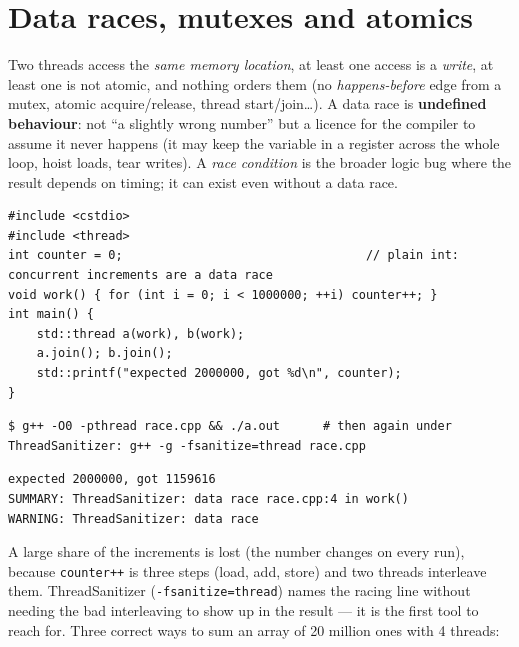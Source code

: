 \documentclass[10pt,a4paper,openany,oneside]{report}
\newcommand{\prio}[1]{\texorpdfstring{\ifcase#1\or{\color{gold}\ding{72}}\or{\color{gold}\ding{72}\ding{72}}\or{\color{gold}\ding{72}\ding{72}\ding{72}}\fi}{}}
\begin{document}
\section{Data races, mutexes and atomics \prio{3}}
\begin{defbox}
Two threads access the \emph{same memory location}, at least one access is a \emph{write}, at least one is not atomic, and nothing orders them (no \emph{happens-before} edge from a mutex, atomic acquire/release, thread start/join\ldots). A data race is \textbf{undefined behaviour}: not ``a slightly wrong number'' but a licence for the compiler to assume it never happens (it may keep the variable in a register across the whole loop, hoist loads, tear writes). A \emph{race condition} is the broader logic bug where the result depends on timing; it can exist even without a data race.
\end{defbox}
\begin{lstlisting}[language={[11]C++},title={race.cpp}]
#include <cstdio>
#include <thread>
int counter = 0;                                  // plain int: concurrent increments are a data race
void work() { for (int i = 0; i < 1000000; ++i) counter++; }
int main() {
    std::thread a(work), b(work);
    a.join(); b.join();
    std::printf("expected 2000000, got %d\n", counter);
}
\end{lstlisting}
\begin{lstlisting}[style=shcmd]
$ g++ -O0 -pthread race.cpp && ./a.out      # then again under ThreadSanitizer: g++ -g -fsanitize=thread race.cpp
\end{lstlisting}
\begin{lstlisting}[style=out]
expected 2000000, got 1159616
SUMMARY: ThreadSanitizer: data race race.cpp:4 in work()
WARNING: ThreadSanitizer: data race 
\end{lstlisting}
A large share of the increments is lost (the number changes on every run), because \texttt{counter++} is three steps (load, add, store) and two threads interleave them. ThreadSanitizer (\texttt{-fsanitize=thread}) names the racing line without needing the bad interleaving to show up in the result --- it is the first tool to reach for. Three correct ways to sum an array of 20 million ones with 4 threads:
\end{document}
